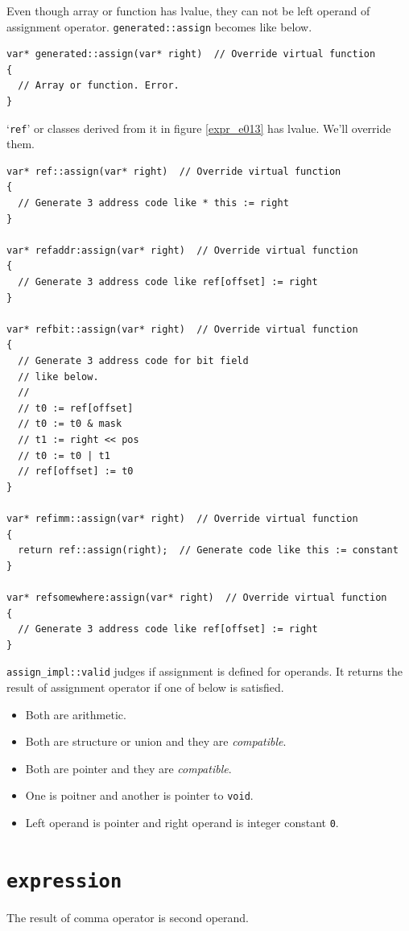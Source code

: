 Even though array or function has lvalue, they can not be left operand
of assignment operator.
{\tt{generated::assign}} becomes like below.
\begin{verbatim}
var* generated::assign(var* right)  // Override virtual function
{
  // Array or function. Error.
}
\end{verbatim}
`{\tt{ref}}' or classes derived from it in figure \ref{expr_e013}
has lvalue. We'll override them.
\begin{verbatim}
var* ref::assign(var* right)  // Override virtual function
{
  // Generate 3 address code like * this := right
}

var* refaddr:assign(var* right)  // Override virtual function
{
  // Generate 3 address code like ref[offset] := right
}

var* refbit::assign(var* right)  // Override virtual function
{
  // Generate 3 address code for bit field
  // like below.
  //
  // t0 := ref[offset]
  // t0 := t0 & mask
  // t1 := right << pos
  // t0 := t0 | t1
  // ref[offset] := t0
}

var* refimm::assign(var* right)  // Override virtual function
{
  return ref::assign(right);  // Generate code like this := constant 
}

var* refsomewhere:assign(var* right)  // Override virtual function
{
  // Generate 3 address code like ref[offset] := right
}
\end{verbatim}

{\tt{assign\_impl::valid}} judges if assignment is defined for operands.
It returns the result of assignment operator if one of below is satisfied.
\begin{itemize}
\item Both are arithmetic.
\item Both are structure or union and they are {\em compatible}.
\item Both are pointer and they are {\em compatible}.
\item One is poitner and another is pointer to {\tt{void}}.
\item Left operand is pointer and right operand is integer constant {\tt{0}}.
\end{itemize}

\section{\tt{expression}}

The result of comma operator is second operand.

